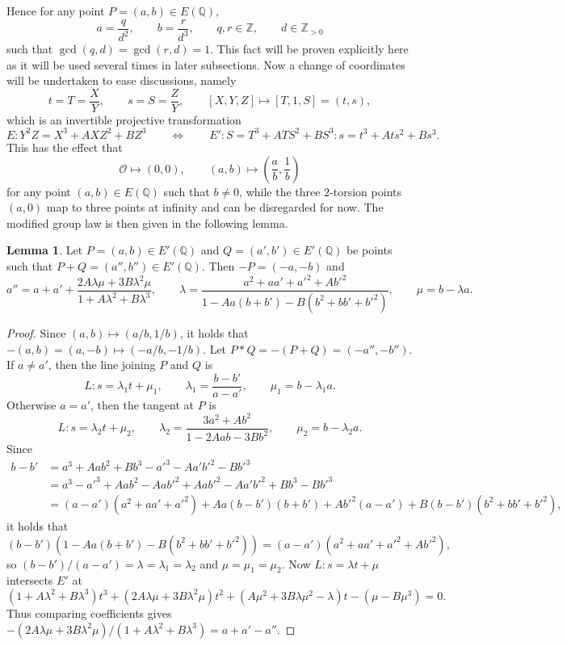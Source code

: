 \documentclass{article}
\newcommand{\Z}{\mathbb{Z}}
\newcommand{\Q}{\mathbb{Q}}
\newcommand{\rb}[1]{\left( #1 \right)}
\renewcommand{\sb}[1]{\left[ #1 \right]}
\theoremstyle{definition}
\newtheorem{lemma}[proposition]{Lemma}
\begin{document}
Hence for any point $ P = \rb{a, b} \in E\rb{\Q} $,
$$ a = \dfrac{q}{d^2}, \qquad b = \dfrac{r}{d^3}, \qquad q, r \in \Z, \qquad d \in \Z_{> 0} $$
such that $ \gcd\rb{q, d} = \gcd\rb{r, d} = 1 $. This fact will be proven explicitly here as it will be used several times in later subsections. Now a change of coordinates will be undertaken to ease discussions, namely
$$ t = T = \dfrac{X}{Y}, \qquad s = S = \dfrac{Z}{Y}, \qquad \sb{X, Y, Z} \mapsto \sb{T, 1, S} = \rb{t, s}, $$
which is an invertible projective transformation
$$ E : Y^2Z = X^3 + AXZ^2 + BZ^3 \qquad \iff \qquad E' : S = T^3 + ATS^2 + BS^3 : s = t^3 + Ats^2 + Bs^3. $$
This has the effect that
$$ \mathcal{O} \mapsto \rb{0, 0}, \qquad \rb{a, b} \mapsto \rb{\dfrac{a}{b}, \dfrac{1}{b}} $$
for any point $ \rb{a, b} \in E\rb{\Q} $ such that $ b \ne 0 $, while the three $ 2 $-torsion points $ \rb{a, 0} $ map to three points at infinity and can be disregarded for now. The modified group law is then given in the following lemma.

\begin{lemma}
Let $ P = \rb{a, b} \in E'\rb{\Q} $ and $ Q = \rb{a', b'} \in E'\rb{\Q} $ be points such that $ P + Q = \rb{a'', b''} \in E'\rb{\Q} $. Then $ -P = \rb{-a, -b} $ and
$$ a'' = a + a' + \dfrac{2A\lambda\mu + 3B\lambda^2\mu}{1 + A\lambda^2 + B\lambda^3}, \qquad \lambda = \dfrac{a^2 + aa' + a'^2 + Ab'^2}{1 - Aa\rb{b + b'} - B\rb{b^2 + bb' + b'^2}}, \qquad \mu = b - \lambda a. $$
\end{lemma}

\begin{proof}
Since $ \rb{a, b} \mapsto \rb{a / b, 1 / b} $, it holds that $ -\rb{a, b} = \rb{a, -b} \mapsto \rb{-a / b, -1 / b} $. Let $ P * Q = -\rb{P + Q} = \rb{-a'', -b''} $. If $ a \ne a' $, then the line joining $ P $ and $ Q $ is
$$ L : s = \lambda_1 t + \mu_1, \qquad \lambda_1 = \dfrac{b - b'}{a - a'}, \qquad \mu_1 = b - \lambda_1 a. $$
Otherwise $ a = a' $, then the tangent at $ P $ is
$$ L : s = \lambda_2 t + \mu_2, \qquad \lambda_2 = \dfrac{3a^2 + Ab^2}{1 - 2Aab - 3Bb^2}, \qquad \mu_2 = b - \lambda_2 a. $$
Since
\begin{align*}
b - b'
& = a^3 + Aab^2 + Bb^3 - a'^3 - Aa'b'^2 - Bb'^3 \\
& = a^3 - a'^3 + Aab^2 - Aab'^2 + Aab'^2 - Aa'b'^2 + Bb^3 - Bb'^3 \\
& = \rb{a - a'}\rb{a^2 + aa' + a'^2} + Aa\rb{b - b'}\rb{b + b'} + Ab'^2\rb{a - a'} + B\rb{b - b'}\rb{b^2 + bb' + b'^2},
\end{align*}
it holds that
$$ \rb{b - b'}\rb{1 - Aa\rb{b + b'} - B\rb{b^2 + bb' + b'^2}} = \rb{a - a'}\rb{a^2 + aa' + a'^2 + Ab'^2}, $$
so $ \rb{b - b'} / \rb{a - a'} = \lambda = \lambda_1 = \lambda_2 $ and $ \mu = \mu_1 = \mu_2 $. Now $ L : s = \lambda t + \mu $ intersects $ E' $ at
$$ \rb{1 + A\lambda^2 + B\lambda^3}t^3 + \rb{2A\lambda\mu + 3B\lambda^2\mu}t^2 + \rb{A\mu^2 + 3B\lambda\mu^2 - \lambda}t - \rb{\mu - B\mu^3} = 0. $$
Thus comparing coefficients gives $ -\rb{2A\lambda\mu + 3B\lambda^2\mu} / \rb{1 + A\lambda^2 + B\lambda^3} = a + a' - a'' $.
\end{proof}
\end{document}
